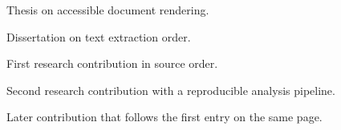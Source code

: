 \documentclass{careerdossier-cv}
\begin{document}
\MakeCDossierHeader
{}
\begin{CDossierEntry}[
  title        = {PhD, Physics},
  organization = {Example University},
  location     = {Toronto, ON},
  dates        = {2016--2020}
]
  \begin{CDossierItemize}
    \item Thesis on accessible document rendering.
  \end{CDossierItemize}
\end{CDossierEntry}
\begin{CDossierEntry}[
  title        = {MSc, Physics},
  organization = {Example Institute},
  location     = {Ottawa, ON},
  dates        = {2014--2016}
]
  \begin{CDossierItemize}
    \item Dissertation on text extraction order.
  \end{CDossierItemize}
\end{CDossierEntry}
\begin{CDossierEntry}[
  title        = {Postdoctoral Researcher},
  organization = {Example University},
  location     = {Toronto, ON},
  dates        = {2024--Present}
]
  \begin{CDossierItemize}
    \item First research contribution in source order.
    \item Second research contribution with a reproducible analysis pipeline.
  \end{CDossierItemize}
\end{CDossierEntry}
\begin{CDossierEntry}[
  title        = {Graduate Researcher},
  organization = {Example Institute},
  location     = {Ottawa, ON},
  dates        = {2020--2024}
]
  \begin{CDossierItemize}
    \item Later contribution that follows the first entry on the same page.
  \end{CDossierItemize}
\end{CDossierEntry}
\end{document}
